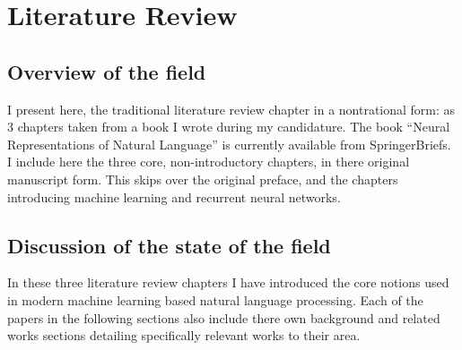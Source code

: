 \documentclass{book}
\begin{document}
\part{Literature Review}
\chapter{Overview of the field}
I present here, the traditional literature review chapter in a nontrational form: as 3 chapters taken from a book I wrote during my candidature.
The book ``Neural Representations of Natural Language'' is currently available from SpringerBriefs.
I include here the three core, non-introductory chapters, in there original manuscript form.
This skips over the original preface, and the chapters introducing machine learning and recurrent neural networks.



\label{LR:WordRep}
\label{LR:SenseRep}
\label{LR:SentenceRep}

\chapter{Discussion of the state of the field}
In these three literature review chapters I have introduced the core notions used in modern machine learning based natural language processing.
Each of the papers in the following sections also include there own background and related works sections detailing specifically relevant works to their area.
\end{document}
